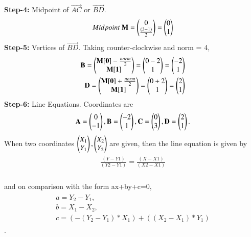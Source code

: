 \documentclass[journal,12pt,twocolumn]{IEEEtran}
\begin{document}
\textbf{Step-4:} Midpoint of $\vec{AC}$ or $\vec{BD}$.
\\
\begin{align}
\begin{split}
Midpoint\ \mathbf{M} = \begin{pmatrix}0 \\ \frac{(3-1)}{2}\end{pmatrix} = \begin{pmatrix}0\\1\end{pmatrix}
\end{split}
\end{align}
\textbf{Step-5:} Vertices of $\vec{BD}$.
Taking counter-clockwise and norm = 4,
\\
\begin{align}
\begin{split}
\mathbf{B} = \begin{pmatrix}\mathbf{M[0]}-\frac{norm}{2}\\\mathbf{M[1]}\end{pmatrix} = \begin{pmatrix}0-2\\1\end{pmatrix} = \begin{pmatrix}-2\\1\end{pmatrix}\\
\mathbf{D} = \begin{pmatrix}\mathbf{M[0]}+\frac{norm}{2}\\\mathbf{M[1]}\end{pmatrix} = \begin{pmatrix}0+2\\1\end{pmatrix} = \begin{pmatrix}2\\1\end{pmatrix}
\end{split}
\end{align}
\textbf{Step-6:} Line Equations.
Coordinates are
\\
\begin{align}
\begin{split}
\mathbf{A} = \begin{pmatrix}0 \\ -1\end{pmatrix},
\mathbf{B} =\begin{pmatrix}-2\\1\end{pmatrix} ,
\mathbf{C} = \begin{pmatrix}0 \\ 3\end{pmatrix},
\mathbf{D} =\begin{pmatrix}2\\1\end{pmatrix}.
\end{split}
\end{align}
When two coordinates $\begin{pmatrix}X_1\\ Y_1\end{pmatrix}, \begin{pmatrix}X_2 \\Y_2\end{pmatrix}$ are given, then the line equation is given by 
\begin{align}
\begin{split}
\frac{(Y-Y1)}{(Y2-Y1)} = \frac{(X-X1)}{(X2-X1)}
\end{split}
\end{align}\\
and on comparison with the form ax+by+c=0,\\ \begin{align}
\begin{split}
a= Y_2-Y_1,\\ b=X_1-X_2, \\c=(-(Y_2-Y_1)*X_1)+((X_2-X_1)*Y_1)
\end{split}
\end{align}.\\ 
\end{document}
